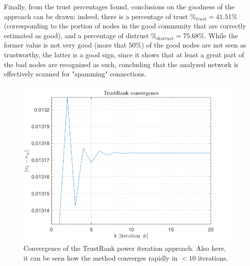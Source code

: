 \documentclass[12pt,a4paper]{article}
\begin{document}
Finally, from the trust percentages found, conclusions on the goodness of the approach can be drawn: indeed, there is a percentage of trust $\%_{trust} = 41.51 \%$ (corresponding to the portion of nodes in the good community that are correctly estimated as good), and a percentage of distrust $\%_{distrust} = 75.68 \%$. While the former value is not very good (more that $50 \%$) of the good nodes are not seen as trustworthy, the latter is a good sign, since it shows that at least a great part of the bad nodes are recognized as such, concluding that the analyzed network is effectively scanned for "spamming" connections.
\begin{figure}
  \includegraphics[width = .6\textwidth]{img/TrustRank_Convergence}
  \caption{Convergence of the TrustRank power iteration approach. Also here, it can be seen how the method converges rapidly in $< 10$ iterations.}
  \label{fig:trust}
\end{figure}



\end{document}
